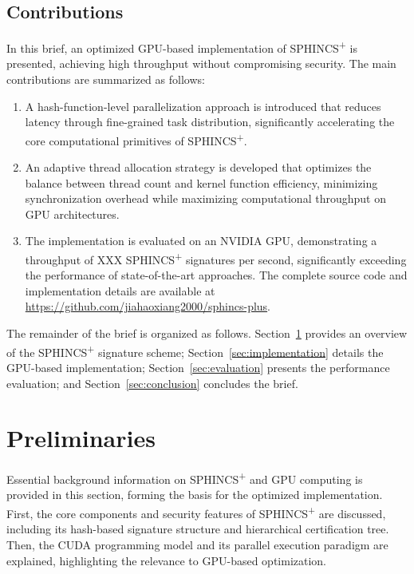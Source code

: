 \documentclass[journal]{IEEEtran}
\begin{document}
\color{black}

\subsection{Contributions}

In this brief, an optimized GPU-based implementation of SPHINCS\textsuperscript{+} is presented, achieving high throughput without compromising security. The main contributions are summarized as follows:

\begin{enumerate}
    \color{blue}
  \item A hash-function-level parallelization approach is introduced that reduces latency through fine-grained task distribution, significantly accelerating the core computational primitives of SPHINCS\textsuperscript{+}.

  \item An adaptive thread allocation strategy is developed that optimizes the balance between thread count and kernel function efficiency, minimizing synchronization overhead while maximizing computational throughput on GPU architectures.
    \color{black}
  \item The implementation is evaluated on an NVIDIA GPU, demonstrating a throughput of XXX SPHINCS\textsuperscript{+} signatures per second, significantly exceeding the performance of state-of-the-art approaches. The complete source code and implementation details are available at \url{https://github.com/jiahaoxiang2000/sphincs-plus}.
\end{enumerate}

The remainder of the brief is organized as follows. Section~\ref{sec:preliminaries} provides an overview of the SPHINCS\textsuperscript{+} signature scheme; Section~\ref{sec:implementation} details the GPU-based implementation; Section~\ref{sec:evaluation} presents the performance evaluation; and Section~\ref{sec:conclusion} concludes the brief.

\section{Preliminaries}\label{sec:preliminaries}


Essential background information on SPHINCS\textsuperscript{+} and GPU computing is provided in this section, forming the basis for the optimized implementation. First, the core components and security features of SPHINCS\textsuperscript{+} are discussed, including its hash-based signature structure and hierarchical certification tree. Then, the CUDA programming model and its parallel execution paradigm are explained, highlighting the relevance to GPU-based optimization.
\end{document}
